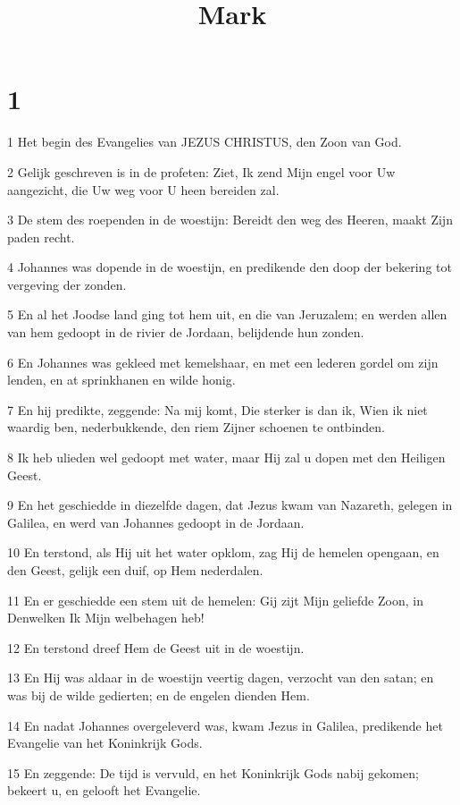 

\title{Mark}



\chapter{1}

\par 1 Het begin des Evangelies van JEZUS CHRISTUS, den Zoon van God.
\par 2 Gelijk geschreven is in de profeten: Ziet, Ik zend Mijn engel voor Uw aangezicht, die Uw weg voor U heen bereiden zal.
\par 3 De stem des roependen in de woestijn: Bereidt den weg des Heeren, maakt Zijn paden recht.
\par 4 Johannes was dopende in de woestijn, en predikende den doop der bekering tot vergeving der zonden.
\par 5 En al het Joodse land ging tot hem uit, en die van Jeruzalem; en werden allen van hem gedoopt in de rivier de Jordaan, belijdende hun zonden.
\par 6 En Johannes was gekleed met kemelshaar, en met een lederen gordel om zijn lenden, en at sprinkhanen en wilde honig.
\par 7 En hij predikte, zeggende: Na mij komt, Die sterker is dan ik, Wien ik niet waardig ben, nederbukkende, den riem Zijner schoenen te ontbinden.
\par 8 Ik heb ulieden wel gedoopt met water, maar Hij zal u dopen met den Heiligen Geest.
\par 9 En het geschiedde in diezelfde dagen, dat Jezus kwam van Nazareth, gelegen in Galilea, en werd van Johannes gedoopt in de Jordaan.
\par 10 En terstond, als Hij uit het water opklom, zag Hij de hemelen opengaan, en den Geest, gelijk een duif, op Hem nederdalen.
\par 11 En er geschiedde een stem uit de hemelen: Gij zijt Mijn geliefde Zoon, in Denwelken Ik Mijn welbehagen heb!
\par 12 En terstond dreef Hem de Geest uit in de woestijn.
\par 13 En Hij was aldaar in de woestijn veertig dagen, verzocht van den satan; en was bij de wilde gedierten; en de engelen dienden Hem.
\par 14 En nadat Johannes overgeleverd was, kwam Jezus in Galilea, predikende het Evangelie van het Koninkrijk Gods.
\par 15 En zeggende: De tijd is vervuld, en het Koninkrijk Gods nabij gekomen; bekeert u, en gelooft het Evangelie.
